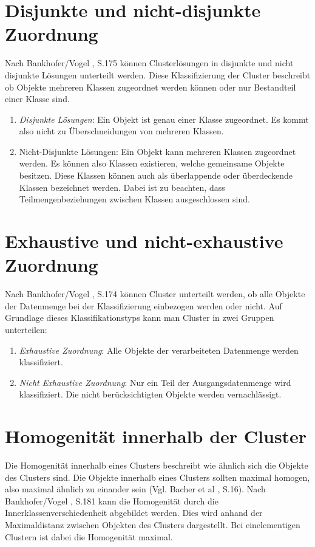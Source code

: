 \section{Disjunkte und nicht-disjunkte Zuordnung}
Nach Bankhofer/Vogel \cite{Bankhofer.2008}, S.175 können Clusterlösungen in disjunkte und nicht disjunkte Lösungen unterteilt werden. Diese Klassifizierung der Cluster beschreibt ob Objekte mehreren Klassen zugeordnet werden können oder nur Bestandteil einer Klasse sind.
\begin{enumerate}
    \item \textit{Disjunkte Lösungen}: Ein Objekt ist genau einer Klasse zugeordnet. Es kommt also nicht zu Überschneidungen von mehreren Klassen.
    \item {Nicht-Disjunkte Lösungen}: Ein Objekt kann mehreren Klassen zugeordnet werden. Es können also Klassen existieren, welche gemeinsame Objekte besitzen. Diese Klassen können auch als überlappende oder überdeckende Klassen bezeichnet werden. Dabei ist zu beachten, dass Teilmengenbeziehungen zwischen Klassen ausgeschlossen sind.
\end{enumerate}

\section{Exhaustive und nicht-exhaustive Zuordnung}
Nach Bankhofer/Vogel \cite{Bankhofer.2008}, S.174 können Cluster unterteilt werden, ob alle Objekte der Datenmenge bei der Klassifizierung einbezogen werden oder nicht. Auf Grundlage dieses Klassifikationstyps kann man Cluster in zwei Gruppen unterteilen:
\begin{enumerate}
    \item \textit{Exhaustive Zuordnung}: Alle Objekte der verarbeiteten Datenmenge werden klassifiziert.
    \item \textit{Nicht Exhaustive Zuordnung}: Nur ein Teil der Ausgangsdatenmenge wird klassifiziert. Die nicht berücksichtigten Objekte werden vernachlässigt.
\end{enumerate}

\section{Homogenität innerhalb der Cluster}
Die Homogenität innerhalb eines Clusters beschreibt wie ähnlich sich die Objekte des Clusters sind. Die Objekte innerhalb eines Clusters sollten maximal homogen, also maximal ähnlich zu einander sein (Vgl. Bacher et al \cite{Bacher.2010}, S.16).
Nach Bankhofer/Vogel \cite{Bankhofer.2008}, S.181 kann die Homogenität durch die Innerklassenverschiedenheit abgebildet werden. Dies wird anhand der Maximaldistanz zwischen Objekten des Clusters dargestellt. Bei einelementigen Clustern ist dabei die Homogenität maximal.


